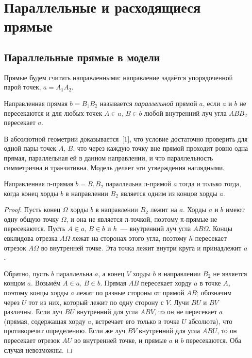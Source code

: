 \section{Параллельные и расходящиеся прямые}

\subsection{Параллельные прямые в модели}

Прямые будем считать направленными: направление задаётся упорядоченной парой точек, $a=A_1A_2$.

\begin{definition}[\!\!{[1,~2]}]
Направленная прямая $b=B_1B_2$ называется \emph{параллельной} прямой $a$, если $a$ и $b$ не пересекаются и для любых точек $A\in a$, $B\in b$ любой внутренний луч угла $ABB_2$ пересекает $a$.
\end{definition}

В абсолютной геометрии доказывается~[1], что условие достаточно проверить для одной пары точек $A$, $B$, что через каждую точку вне прямой проходит ровно одна прямая, параллельная ей в данном направлении, и что параллельность симметрична и транзитивна. Модель делает эти утверждения наглядными.

\begin{theorem}\label{thm:parallel-model}
Направленная π-прямая $b=B_1B_2$ параллельна π-прямой $a$ тогда и только тогда, когда конец хорды $b$ в направлении $B_2$ является одним из концов хорды $a$.
\end{theorem}
\begin{proof}
Пусть конец $\Omega$ хорды $b$ в направлении $B_2$ лежит на $a$. Хорды $a$ и $b$ имеют одну общую точку $\Omega$, и она не является π-точкой, поэтому π-прямые не пересекаются. Пусть $A\in a$, $B\in b$ и $h$~--- внутренний луч угла $AB\Omega$. Концы евклидова отрезка $A\Omega$ лежат на сторонах этого угла, поэтому $h$ пересекает отрезок $A\Omega$ во внутренней точке. Эта точка лежит внутри круга и принадлежит $a$.

Обратно, пусть $b$ параллельна $a$, а конец $V$ хорды $b$ в направлении $B_2$ не является концом $a$. Возьмём $A\in a$, $B\in b$. Прямая $AB$ пересекает хорду $a$ в точке $A$, поэтому концы хорды $a$ лежат по разные стороны от прямой $AB$; обозначим через $U$ тот из них, который лежит по одну сторону с $V$. Лучи $BU$ и $BV$ различны. Если луч $BU$ внутренний для угла $ABV$, то он не пересекает $a$ (прямая, содержащая хорду $a$, встречает его только в точке $U$ абсолюта), что противоречит определению. Если же луч $BV$ внутренний для угла $ABU$, то он пересекает отрезок $AU$ во внутренней точке, и прямые $a$ и $b$ пересекаются. Оба случая невозможны.
\end{proof}

